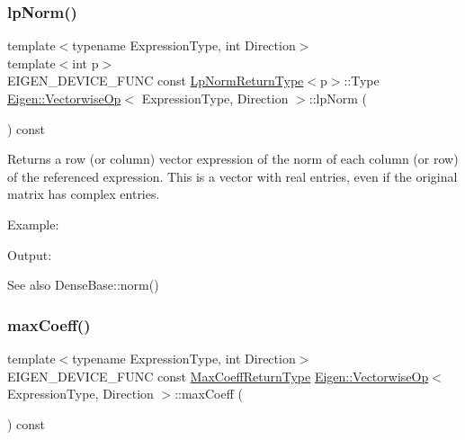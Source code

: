 \subsubsection{\texorpdfstring{lpNorm()}{lpNorm()}}
{\footnotesize\ttfamily template$<$typename Expression\+Type, int Direction$>$ \\
template$<$int p$>$ \\
E\+I\+G\+E\+N\+\_\+\+D\+E\+V\+I\+C\+E\+\_\+\+F\+U\+NC const \mbox{\hyperlink{struct_eigen_1_1_vectorwise_op_1_1_lp_norm_return_type}{Lp\+Norm\+Return\+Type}}$<$p$>$\+::Type \mbox{\hyperlink{class_eigen_1_1_vectorwise_op}{Eigen\+::\+Vectorwise\+Op}}$<$ Expression\+Type, Direction $>$\+::lp\+Norm (\begin{DoxyParamCaption}{ }\end{DoxyParamCaption}) const\hspace{0.3cm}{\ttfamily [inline]}}

\begin{DoxyReturn}{Returns}
a row (or column) vector expression of the norm of each column (or row) of the referenced expression. This is a vector with real entries, even if the original matrix has complex entries.
\end{DoxyReturn}
Example\+: 
\begin{DoxyCodeInclude}{0}
\end{DoxyCodeInclude}
 Output\+: 
\begin{DoxyVerbInclude}
\end{DoxyVerbInclude}


\begin{DoxySeeAlso}{See also}
Dense\+Base\+::norm() 
\end{DoxySeeAlso}
\mbox{\label{class_eigen_1_1_vectorwise_op_a48457cc94227563bca448496aaad8e9c}} 
\subsubsection{\texorpdfstring{maxCoeff()}{maxCoeff()}}
{\footnotesize\ttfamily template$<$typename Expression\+Type, int Direction$>$ \\
E\+I\+G\+E\+N\+\_\+\+D\+E\+V\+I\+C\+E\+\_\+\+F\+U\+NC const \mbox{\hyperlink{class_eigen_1_1_partial_redux_expr}{Max\+Coeff\+Return\+Type}} \mbox{\hyperlink{class_eigen_1_1_vectorwise_op}{Eigen\+::\+Vectorwise\+Op}}$<$ Expression\+Type, Direction $>$\+::max\+Coeff (\begin{DoxyParamCaption}{ }\end{DoxyParamCaption}) const\hspace{0.3cm}{\ttfamily [inline]}}

